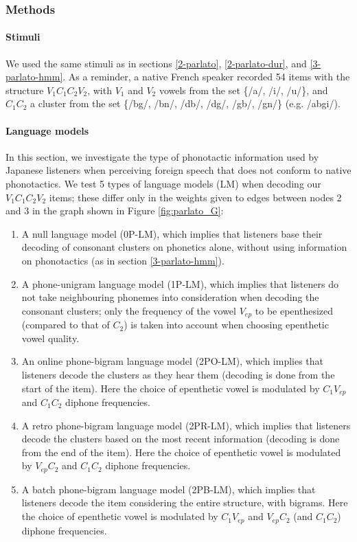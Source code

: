 \subsubsection{Methods}
\paragraph{Stimuli}
We used the same stimuli as in sections \ref{2-parlato}, \ref{2-parlato-dur}, and \ref{3-parlato-hmm}. As a reminder, a native French speaker recorded 54 items with the structure $V_{1}C_{1}C_{2}V_{2}$, with $V_{1}$ and $V_{2}$ vowels from the set \{/a/, /i/, /u/\}, and $C_{1}C_{2}$ a cluster from the set \{/bg/, /bn/, /db/, /dg/, /gb/, /gn/\} (e.g. /abgi/).

\paragraph{Language models}
In this section, we investigate the type of phonotactic information used by Japanese listeners when perceiving foreign speech that does not conform to native phonotactics. We test 5 types of language models (LM) when decoding our $V_{1}C_{1}C_{2}V_{2}$ items; these differ only in the weights given to edges between nodes 2 and 3 in the graph shown in Figure \ref{fig:parlato_G}: 
\begin{enumerate}
    \item A null language model (\textsc{0P-LM}), which implies that listeners base their decoding of consonant clusters on phonetics alone, without using information on phonotactics (as in section \ref{3-parlato-hmm}).
    \item A phone-unigram language model (\textsc{1P-LM}), which implies that listeners do not take neighbouring phonemes into consideration when decoding the consonant clusters; only the frequency of the vowel $V_{ep}$ to be epenthesized (compared to that of $C_{2}$) is taken into account when choosing epenthetic vowel quality.
    \item An online phone-bigram language model (\textsc{2PO-LM}), which implies that listeners decode the clusters as they hear them (decoding is done from the start of the item). Here the choice of epenthetic vowel is modulated by $C_{1}V_{ep}$ and $C_{1}C_{2}$ diphone frequencies. 
    \item A retro phone-bigram language model (\textsc{2PR-LM}), which implies that listeners decode the clusters based on the most recent information (decoding is done from the end of the item). Here the choice of epenthetic vowel is modulated by $V_{ep}C_{2}$ and $C_{1}C_{2}$ diphone frequencies.
    \item A batch phone-bigram language model (\textsc{2PB-LM}), which implies that listeners decode the item considering the entire structure, with bigrams. Here the choice of epenthetic vowel is modulated by $C_{1}V_{ep}$ and $V_{ep}C_{2}$ (and $C_{1}C_{2}$) diphone frequencies.  
\end{enumerate}

